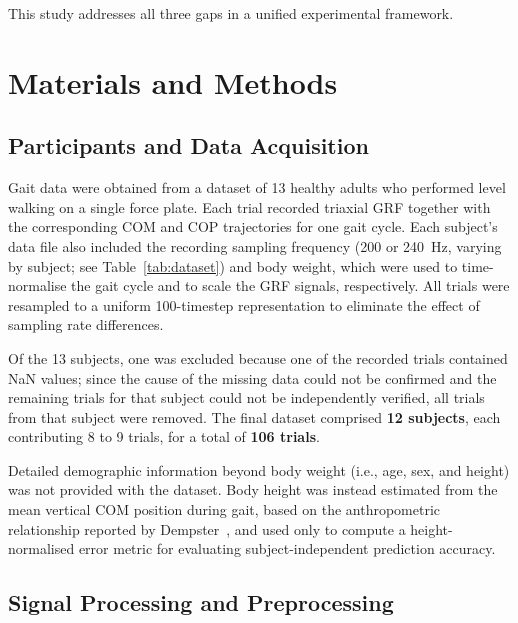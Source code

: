 \documentclass[preprint,12pt]{elsarticle}
\begin{document}
This study addresses all three gaps in a unified experimental framework.

\section{Materials and Methods}
\label{sec:methods}

\subsection{Participants and Data Acquisition}
\label{subsec:data}

Gait data were obtained from a dataset of 13 healthy adults who performed level
walking on a single force plate.
Each trial recorded triaxial GRF together with the corresponding COM and COP
trajectories for one gait cycle.
Each subject's data file also included the recording sampling frequency (200 or
240~Hz, varying by subject; see Table~\ref{tab:dataset}) and body weight, which
were used to time-normalise the gait cycle and to scale the GRF signals,
respectively.
All trials were resampled to a uniform 100-timestep representation to eliminate
the effect of sampling rate differences.

Of the 13 subjects, one was excluded because one of the recorded trials contained
NaN values; since the cause of the missing data could not be confirmed and the
remaining trials for that subject could not be independently verified, all trials
from that subject were removed.
The final dataset comprised \textbf{12 subjects}, each contributing 8 to 9 trials,
for a total of \textbf{106 trials}.

Detailed demographic information beyond body weight (i.e., age, sex, and
height) was not provided with the dataset.
Body height was instead estimated from the mean vertical COM position during gait,
based on the anthropometric relationship reported by Dempster~\cite{dempster1955},
and used only to compute a height-normalised error metric for evaluating
subject-independent prediction accuracy.

\subsection{Signal Processing and Preprocessing}
\label{subsec:preproc}
\end{document}
